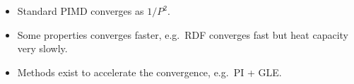 \begin{frame}
\begin{multicols}{2}
\begin{itemize}
    \item Standard PIMD converges as $1/P^2$.
    \item Some properties converges faster, e.g.\ RDF converges fast but heat
      capacity very slowly.
    \item Methods exist to accelerate the convergence, e.g.\ PI + GLE.
      \bigskip
    \end{itemize}

  \end{multicols}
\end{frame}

